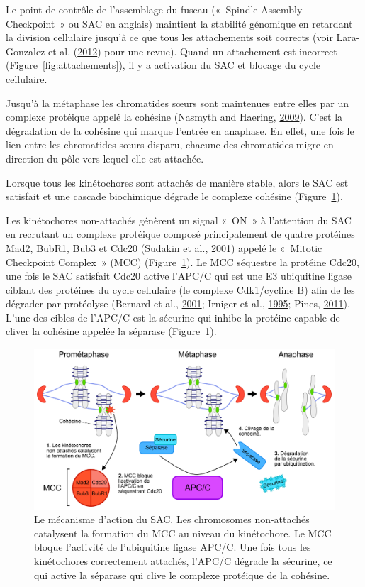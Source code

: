 \documentclass[12pt,a4paper,twoside,openright]{book}
\begin{document}
\label{sec:sac}

Le point de contrôle de l'assemblage du fuseau («~Spindle Assembly
Checkpoint~» ou SAC en anglais) maintient la stabilité génomique en
retardant la division cellulaire jusqu'à ce que tous les attachements
soit corrects (voir Lara-Gonzalez et al.
(\protect\hyperlink{ref-Lara-Gonzalez2012}{2012}) pour une revue). Quand
un attachement est incorrect (Figure~\ref{fig:attachements}), il y a
activation du SAC et blocage du cycle cellulaire.

Jusqu'à la métaphase les chromatides sœurs sont maintenues entre elles
par un complexe protéique appelé la cohésine (Nasmyth and Haering,
\protect\hyperlink{ref-Nasmyth2009}{2009}). C'est la dégradation de la
cohésine qui marque l'entrée en anaphase. En effet, une fois le lien
entre les chromatides sœurs disparu, chacune des chromatides migre en
direction du pôle vers lequel elle est attachée.

Lorsque tous les kinétochores sont attachés de manière stable, alors le
SAC est satisfait et une cascade biochimique dégrade le complexe
cohésine (Figure~\ref{fig:sac}).

Les kinétochores non-attachés génèrent un signal «~ON~» à l'attention du
SAC en recrutant un complexe protéique composé principalement de quatre
protéines Mad2, BubR1, Bub3 et Cdc20 (Sudakin et al.,
\protect\hyperlink{ref-Sudakin2001}{2001}) appelé le «~Mitotic
Checkpoint Complex~» (MCC) (Figure~\ref{fig:sac}). Le MCC séquestre la
protéine Cdc20, une fois le SAC satisfait Cdc20 active l'APC/C qui est
une E3 ubiquitine ligase ciblant des protéines du cycle cellulaire (le
complexe Cdk1/cycline B) afin de les dégrader par protéolyse (Bernard et
al., \protect\hyperlink{ref-Bernard2001}{2001}; Irniger et al.,
\protect\hyperlink{ref-Irniger1995}{1995}; Pines,
\protect\hyperlink{ref-Pines2011}{2011}). L'une des cibles de l'APC/C
est la sécurine qui inhibe la protéine capable de cliver la cohésine
appelée la séparase (Figure~\ref{fig:sac}).

\begin{figure}[htbp]
\centering
\includegraphics{figures/intro/sac.png}
\caption[Le mécanisme d'action du SAC]{\label{fig:sac}Le mécanisme
d'action du SAC. Les chromosomes non-attachés catalysent la formation du
MCC au niveau du kinétochore. Le MCC bloque l'activité de l'ubiquitine
ligase APC/C. Une fois tous les kinétochores correctement attachés,
l'APC/C dégrade la sécurine, ce qui active la séparase qui clive le
complexe protéique de la cohésine.}
\end{figure}
\end{document}

